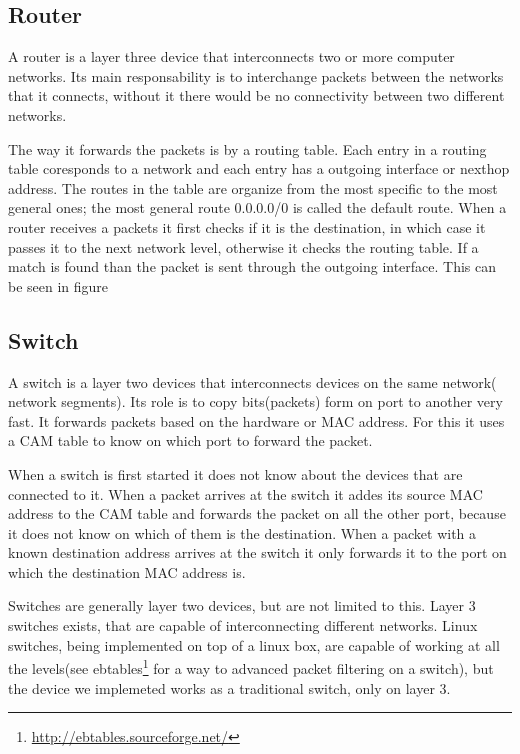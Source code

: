 \subsection{Router}
\label{sub-sec:router}

A router is a layer three device that interconnects two or more computer networks. Its main responsability
is to interchange packets between the networks that it connects, without it there would be no connectivity 
between two different networks.

The way it forwards the packets is by a routing table. Each entry in a routing table coresponds to a network
and each entry has a outgoing interface or nexthop address. The routes in the table are organize from the most specific
to the most general ones; the most general route 0.0.0.0/0 is called the default route. When a router receives a packets it 
first checks if it is the destination, in which case it passes it to the next network level, otherwise it checks the routing
table. If a match is found than the packet is sent through the outgoing interface. This can be seen in figure 


\subsection{Switch}
\label{sub-sec:switch}

A switch is a layer two devices that interconnects devices on the same network( network segments). Its role is 
to copy bits(packets) form on port to another very fast. It forwards packets based on the hardware or MAC address. 
For this it uses a CAM table to know on which port to forward the packet. 

When a switch is first started it does not know about the devices that are connected to it. When a packet arrives
at the switch it addes its source MAC address to the CAM table and forwards the packet on all the other port, because
it does not know on which of them is the destination. When a packet with a known destination address arrives at the
switch it only forwards it to the port on which the destination MAC address is.

Switches are generally layer two devices, but are not limited to this. Layer 3 switches exists, that are capable of 
interconnecting different networks. Linux switches, being implemented on top of a linux box, are capable of working
at all the levels(see ebtables\footnote{\url{http://ebtables.sourceforge.net/}} for a way to advanced packet filtering
on a switch), but the device we implemeted works as a traditional switch, only on layer 3.

